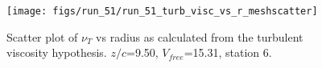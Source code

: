\begin{figure}[H]
\centering
\texttt{[image: figs/run\_51/run\_51\_turb\_visc\_vs\_r\_meshscatter]}
\caption{Scatter plot of $\nu_T$ vs radius as calculated from the turbulent viscosity hypothesis. $z/c$=9.50, $V_{free}$=15.31, station 6.}
\label{fig:run_51_turb_visc_vs_r_meshscatter}
\end{figure}


